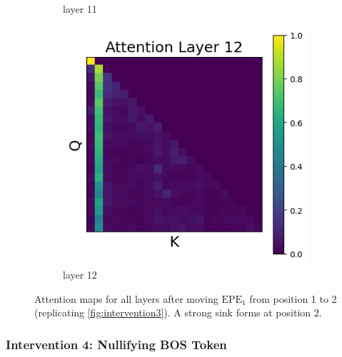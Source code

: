 \documentclass[11pt]{article}
\begin{document}
\begin{figure}[t]
\begin{subfigure}[t]{0.24\textwidth}
    \caption{layer 11}
  \end{subfigure}\hfill
  \begin{subfigure}[t]{0.24\textwidth}
    \centering
    \includegraphics[width=1.4\columnwidth]{figures/intervention3/layer_12.png}
    \caption{layer 12}
  \end{subfigure}\hfill

  \caption{Attention maps for all layers after moving $\mathrm{EPE}_1$ from position 1 to 2 (replicating \cref{fig:intervention3}). A strong sink forms at position 2.}
\end{figure}

\subsubsection{Intervention 4: Nullifying BOS Token}\label{app:intervention4}
\end{document}
